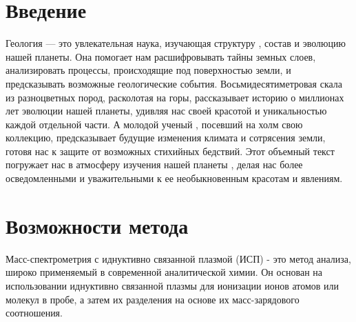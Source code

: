\documentclass{esdiploma}
\begin{document}


\maketitle

\tableofcontents

\chapter*{Введение}
Геология --- это увлекательная наука, изучающая структуру \citep{korolyuk1960}, состав и эволюцию нашей планеты. Она помогает нам расшифровывать тайны земных слоев, анализировать процессы, происходящие под поверхностью земли, и предсказывать возможные геологические события. Восьмидесятиметровая скала \citep{Shukolyukov1974} из разноцветных пород, расколотая на горы, рассказывает историю о миллионах лет эволюции нашей планеты, удивляя нас своей красотой и уникальностью каждой отдельной части. А молодой ученый \citep{Roberts2020}, посевший на холм свою коллекцию, предсказывает будущие изменения климата и сотрясения земли, готовя нас к защите от возможных стихийных бедствий. Этот объемный текст погружает нас в атмосферу изучения нашей планеты , делая нас более осведомленными и уважительными к ее необыкновенным красотам и явлениям.

\chapter{Возможности метода}

Масс-спектрометрия с иднуктивно связанной плазмой (ИСП) - это метод анализа, широко применяемый в современной аналитической химии. Он основан на использовании иднуктивно связанной плазмы для ионизации ионов атомов или молекул в пробе, а затем их разделения на основе их масс-зарядового соотношения.
\end{document}
